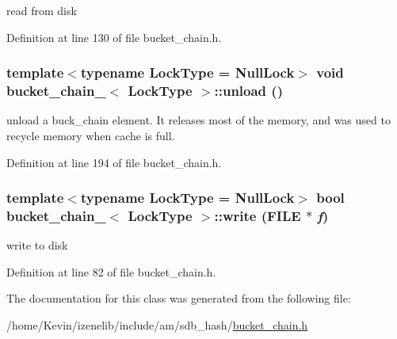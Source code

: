 read from disk 

Definition at line 130 of file bucket\_\-chain.h.\hypertarget{classbucket__chain___2dccc2c72a6f9b5bda83f627e11124b8}{
\subsubsection[{unload}]{\setlength{\rightskip}{0pt plus 5cm}template$<$typename LockType  = NullLock$>$ void {\bf bucket\_\-chain\_\-}$<$ LockType $>$::unload ()}}
\label{classbucket__chain___2dccc2c72a6f9b5bda83f627e11124b8}


unload a buck\_\-chain element. It releases most of the memory, and was used to recycle memory when cache is full. 

Definition at line 194 of file bucket\_\-chain.h.\hypertarget{classbucket__chain___f237564af670084175b423af68bc85f0}{
\subsubsection[{write}]{\setlength{\rightskip}{0pt plus 5cm}template$<$typename LockType  = NullLock$>$ bool {\bf bucket\_\-chain\_\-}$<$ LockType $>$::write (FILE $\ast$ {\em f})}}
\label{classbucket__chain___f237564af670084175b423af68bc85f0}


write to disk 

Definition at line 82 of file bucket\_\-chain.h.

The documentation for this class was generated from the following file:\begin{CompactItemize}
\item 
/home/Kevin/izenelib/include/am/sdb\_\-hash/\hyperlink{bucket__chain_8h}{bucket\_\-chain.h}\end{CompactItemize}
